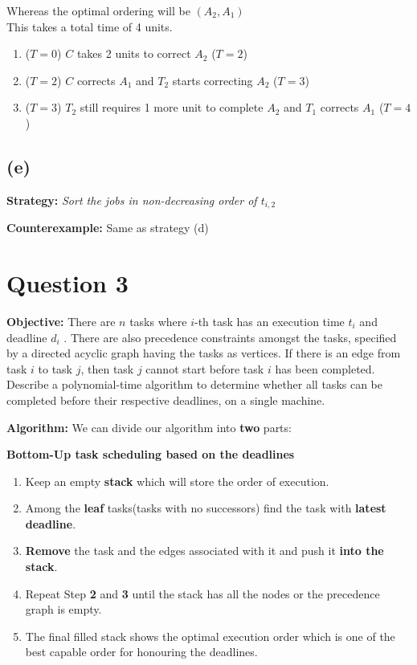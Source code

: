 \documentclass[11pt, fleqn]{article}
\begin{document}
\smallskip
Whereas the optimal ordering will be $(A_2, A_1)$\\
This takes a total time of 4 units.
\begin{enumerate}[itemsep=-0.5ex,topsep=1pt]
    \item ($T = 0$) $C$ takes 2 units to correct $A_2$ ($T = 2$)
    \item ($T = 2$) $C$ corrects $A_1$ and $T_2$ starts correcting $A_2$ ($T = 3$)
    \item ($T = 3$) $T_2$ still requires 1 more unit to complete $A_2$ and $T_1$ corrects $A_1$ ($T = 4$)
\end{enumerate}

\subsection*{(e)}
\textbf{Strategy:} \textit{Sort the jobs in non-decreasing order of $t_{i,2}$}

\smallskip
\textbf{Counterexample:} Same as strategy (d) \\


\newpage 
\section*{Question 3}
\label{q3}
\setcounter{equation}{0}

\textbf{Objective:} There are $n$ tasks where $i$-th task has an execution time $t_i$ and deadline $d_i$ . There are also precedence constraints amongst the tasks, specified by a directed acyclic graph having the tasks as vertices. If there is an edge from task $i$ to task $j$, then task $j$ cannot start before task $i$ has been completed. Describe a polynomial-time algorithm to determine whether all tasks can be completed before their respective deadlines, on a single machine. 

\hrulefill

\textbf{Algorithm:} 
We can divide our algorithm into \textbf{two} parts: \par

\textbf{Bottom-Up task scheduling based on the deadlines}
\begin{enumerate}
    \item Keep an empty \textbf{stack} which will store the order of execution.
    
    \item Among the \textbf{leaf} tasks(tasks with no successors) find the task with \textbf{latest deadline}.
    
    \item \textbf{Remove} the task and the edges associated with it and push it \textbf{into the stack}.
    
    \item Repeat Step \textbf{2} and \textbf{3} until the stack has all the nodes or the precedence graph is empty.
    
    \item The final filled stack shows the optimal execution order which is one of the best capable order for honouring the deadlines.
\end{enumerate}
\end{document}
